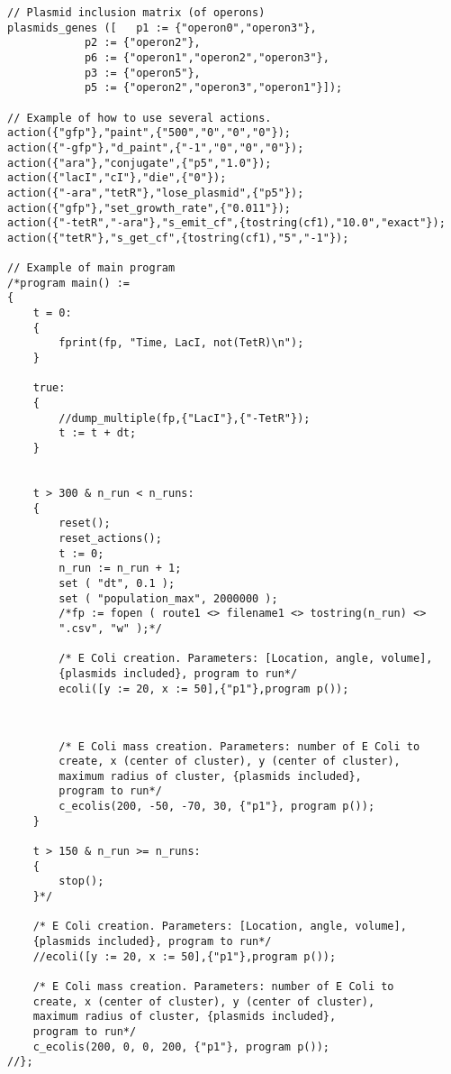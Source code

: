\documentclass[10pt,a4paper]{article}
\begin{document}
\newpage
\begin{Verbatim}[obeytabs]
// Plasmid inclusion matrix (of operons) 
plasmids_genes ([	p1 := {"operon0","operon3"},
			p2 := {"operon2"},
			p6 := {"operon1","operon2","operon3"},
			p3 := {"operon5"},
			p5 := {"operon2","operon3","operon1"}]);

// Example of how to use several actions.
action({"gfp"},"paint",{"500","0","0","0"});
action({"-gfp"},"d_paint",{"-1","0","0","0"});
action({"ara"},"conjugate",{"p5","1.0"});
action({"lacI","cI"},"die",{"0"});
action({"-ara","tetR"},"lose_plasmid",{"p5"});
action({"gfp"},"set_growth_rate",{"0.011"});
action({"-tetR","-ara"},"s_emit_cf",{tostring(cf1),"10.0","exact"});
action({"tetR"},"s_get_cf",{tostring(cf1),"5","-1"});

// Example of main program
/*program main() :=
{
	t = 0: 
	{
		fprint(fp, "Time, LacI, not(TetR)\n");
	}
	
	true: 
	{
		//dump_multiple(fp,{"LacI"},{"-TetR"});
		t := t + dt;
	}
     
	
	t > 300 & n_run < n_runs:
	{
		reset();
		reset_actions();
		t := 0;
		n_run := n_run + 1;
		set ( "dt", 0.1 );
		set ( "population_max", 2000000 );
		/*fp := fopen ( route1 <> filename1 <> tostring(n_run) <>
		".csv", "w" );*/
		
		/* E Coli creation. Parameters: [Location, angle, volume],
		{plasmids included}, program to run*/
		ecoli([y := 20, x := 50],{"p1"},program p());
		
\end{Verbatim}

\newpage
\begin{Verbatim}[obeytabs]
		
		/* E Coli mass creation. Parameters: number of E Coli to
		create, x (center of cluster), y (center of cluster), 
		maximum radius of cluster, {plasmids included}, 
		program to run*/
		c_ecolis(200, -50, -70, 30, {"p1"}, program p());
	}
	
	t > 150 & n_run >= n_runs:
	{
		stop(); 
	}*/
	
	/* E Coli creation. Parameters: [Location, angle, volume],
	{plasmids included}, program to run*/
	//ecoli([y := 20, x := 50],{"p1"},program p());
	
	/* E Coli mass creation. Parameters: number of E Coli to
	create, x (center of cluster), y (center of cluster), 
	maximum radius of cluster, {plasmids included}, 
	program to run*/
	c_ecolis(200, 0, 0, 200, {"p1"}, program p());
//};
\end{Verbatim}
\end{document}
